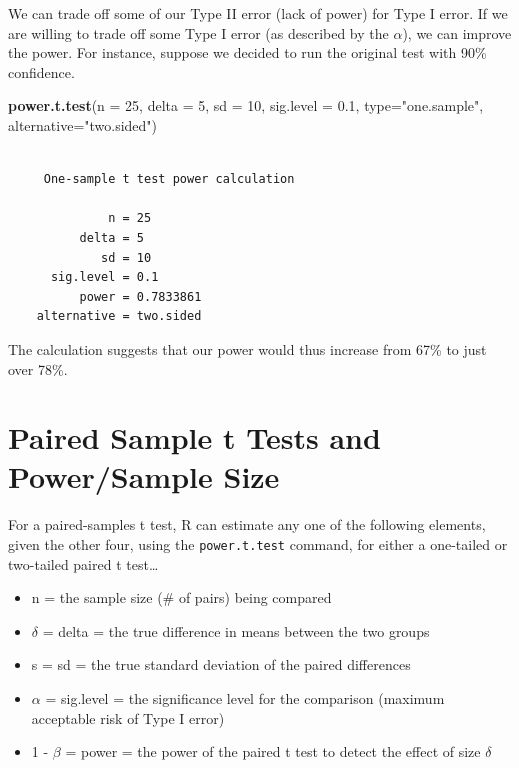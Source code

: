 \documentclass[
]{book}
\newenvironment{Shaded}{\begin{snugshade}}{\end{snugshade}}
\newcommand{\DataTypeTok}[1]{\textcolor[rgb]{0.13,0.29,0.53}{#1}}
\newcommand{\DecValTok}[1]{\textcolor[rgb]{0.00,0.00,0.81}{#1}}
\newcommand{\FloatTok}[1]{\textcolor[rgb]{0.00,0.00,0.81}{#1}}
\newcommand{\KeywordTok}[1]{\textcolor[rgb]{0.13,0.29,0.53}{\textbf{#1}}}
\newcommand{\NormalTok}[1]{#1}
\newcommand{\StringTok}[1]{\textcolor[rgb]{0.31,0.60,0.02}{#1}}
\providecommand{\tightlist}{%
  \setlength{\itemsep}{0pt}\setlength{\parskip}{0pt}}
\begin{document}
We can trade off some of our Type II error (lack of power) for Type I error. If we are willing to trade off some Type I error (as described by the \(\alpha\)), we can improve the power. For instance, suppose we decided to run the original test with 90\% confidence.

\begin{Shaded}
\begin{Highlighting}[]
\KeywordTok{power.t.test}\NormalTok{(}\DataTypeTok{n =} \DecValTok{25}\NormalTok{, }\DataTypeTok{delta =} \DecValTok{5}\NormalTok{, }\DataTypeTok{sd =} \DecValTok{10}\NormalTok{, }\DataTypeTok{sig.level =} \FloatTok{0.1}\NormalTok{, }
             \DataTypeTok{type=}\StringTok{"one.sample"}\NormalTok{, }\DataTypeTok{alternative=}\StringTok{"two.sided"}\NormalTok{)}
\end{Highlighting}
\end{Shaded}

\begin{verbatim}

     One-sample t test power calculation 

              n = 25
          delta = 5
             sd = 10
      sig.level = 0.1
          power = 0.7833861
    alternative = two.sided
\end{verbatim}

The calculation suggests that our power would thus increase from 67\% to just over 78\%.

\hypertarget{paired-sample-t-tests-and-powersample-size}{%
\section{Paired Sample t Tests and Power/Sample Size}\label{paired-sample-t-tests-and-powersample-size}}

For a paired-samples t test, R can estimate any one of the following elements, given the other four, using the \texttt{power.t.test} command, for either a one-tailed or two-tailed paired t test\ldots{}

\begin{itemize}
\tightlist
\item
  n = the sample size (\# of pairs) being compared
\item
  \(\delta\) = delta = the true difference in means between the two groups
\item
  s = sd = the true standard deviation of the paired differences
\item
  \(\alpha\) = sig.level = the significance level for the comparison (maximum acceptable risk of Type I error)
\item
  1 - \(\beta\) = power = the power of the paired t test to detect the effect of size \(\delta\)
\end{itemize}
\end{document}
